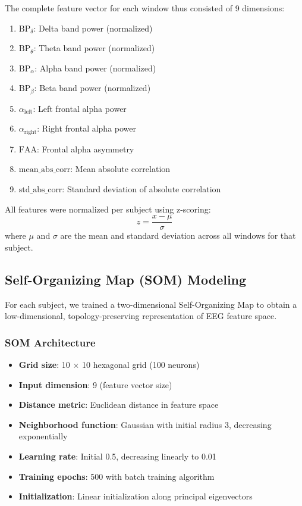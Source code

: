 The complete feature vector for each window thus consisted of 9 dimensions:
\begin{enumerate}
    \item $\text{BP}_{\delta}$: Delta band power (normalized)
    \item $\text{BP}_{\theta}$: Theta band power (normalized)
    \item $\text{BP}_{\alpha}$: Alpha band power (normalized)
    \item $\text{BP}_{\beta}$: Beta band power (normalized)
    \item $\alpha_{\text{left}}$: Left frontal alpha power
    \item $\alpha_{\text{right}}$: Right frontal alpha power
    \item $\text{FAA}$: Frontal alpha asymmetry
    \item $\text{mean\_abs\_corr}$: Mean absolute correlation
    \item $\text{std\_abs\_corr}$: Standard deviation of absolute correlation
\end{enumerate}

All features were normalized per subject using z-scoring:
\begin{equation}
z = \frac{x - \mu}{\sigma}
\end{equation}
where $\mu$ and $\sigma$ are the mean and standard deviation across all windows for that subject.

\subsection{Self-Organizing Map (SOM) Modeling}

For each subject, we trained a two-dimensional Self-Organizing Map to obtain a low-dimensional, topology-preserving representation of EEG feature space.

\subsubsection{SOM Architecture}

\begin{itemize}
    \item \textbf{Grid size}: 10 $\times$ 10 hexagonal grid (100 neurons)
    \item \textbf{Input dimension}: 9 (feature vector size)
    \item \textbf{Distance metric}: Euclidean distance in feature space
    \item \textbf{Neighborhood function}: Gaussian with initial radius 3, decreasing exponentially
    \item \textbf{Learning rate}: Initial 0.5, decreasing linearly to 0.01
    \item \textbf{Training epochs}: 500 with batch training algorithm
    \item \textbf{Initialization}: Linear initialization along principal eigenvectors
\end{itemize}

